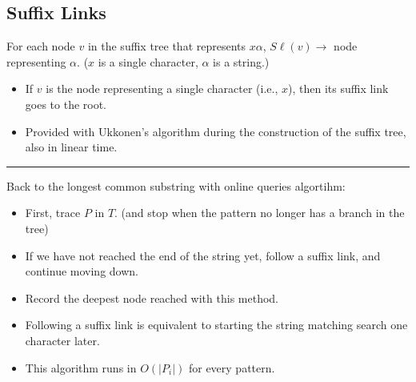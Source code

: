 \documentclass[10pt]{article}
\begin{document}
\subsection*{Suffix Links}
For each node $v$ in the suffix tree that represents $x\alpha$, $S\ell(v) \rightarrow$ node representing $\alpha$.  ($x$ is a single character, $\alpha$ is a string.)
\begin{itemize}
    \item If $v$ is the node representing a single character (i.e., $x$), then its suffix link goes to the root.
	\item Provided with Ukkonen's algorithm during the construction of the suffix tree, also in linear time.
\end{itemize}
\noindent\rule{\textwidth}{1pt}
Back to the longest common substring with online queries algortihm:
\begin{itemize}
	\item First, trace $P$ in $T$.  (and stop when the pattern no longer has a branch in the tree)
	\item If we have not reached the end of the string yet, follow a suffix link, and continue moving down.
	\item Record the deepest node reached with this method.
	\item Following a suffix link is equivalent to starting the string matching search one character later.
	\item This algorithm runs in $O(|P_i|)$ for every pattern.
\end{itemize}
\end{document}
